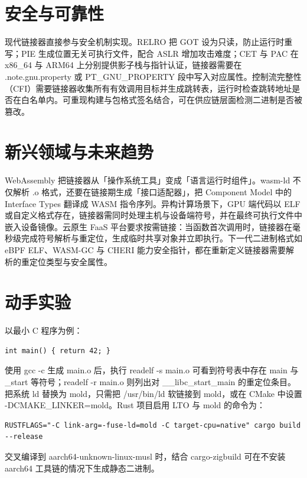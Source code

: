 \chapter{安全与可靠性}
现代链接器直接参与安全机制实现。RELRO 把 GOT 设为只读，防止运行时重写；PIE 生成位置无关可执行文件，配合 ASLR 增加攻击难度；CET 与 PAC 在 x86\_{}64 与 ARM64 上分别提供影子栈与指针认证，链接器需要在 .note.gnu.property 或 PT\_{}GNU\_{}PROPERTY 段中写入对应属性。控制流完整性（CFI）需要链接器收集所有有效调用目标并生成跳转表，运行时检查跳转地址是否在白名单内。可重现构建与包格式签名结合，可在供应链层面检测二进制是否被篡改。\par
\chapter{新兴领域与未来趋势}
WebAssembly 把链接器从「操作系统工具」变成「语言运行时组件」。wasm-ld 不仅解析 .o 格式，还要在链接期生成「接口适配器」，把 Component Model 中的 Interface Types 翻译成 WASM 指令序列。异构计算场景下，GPU 端代码以 ELF 或自定义格式存在，链接器需同时处理主机与设备端符号，并在最终可执行文件中嵌入设备镜像。云原生 FaaS 平台要求按需链接：当函数首次调用时，链接器在毫秒级完成符号解析与重定位，生成临时共享对象并立即执行。下一代二进制格式如 eBPF ELF、WASM-GC 与 CHERI 能力安全指针，都在重新定义链接器需要解析的重定位类型与安全属性。\par
\chapter{动手实验}
以最小 C 程序为例：\par
\begin{lstlisting}
int main() { return 42; }
\end{lstlisting}
使用 gcc -c 生成 main.o 后，执行 readelf -s main.o 可看到符号表中存在 main 与 \_{}start 等符号；readelf -r main.o 则列出对 \_{}\_{}libc\_{}start\_{}main 的重定位条目。把系统 ld 替换为 mold，只需把 /usr/bin/ld 软链接到 mold，或在 CMake 中设置 -DCMAKE\_{}LINKER=mold。Rust 项目启用 LTO 与 mold 的命令为：\par
\begin{lstlisting}
RUSTFLAGS="-C link-arg=-fuse-ld=mold -C target-cpu=native" cargo build --release
\end{lstlisting}
交叉编译到 aarch64-unknown-linux-musl 时，结合 cargo-zigbuild 可在不安装 aarch64 工具链的情况下生成静态二进制。\par
